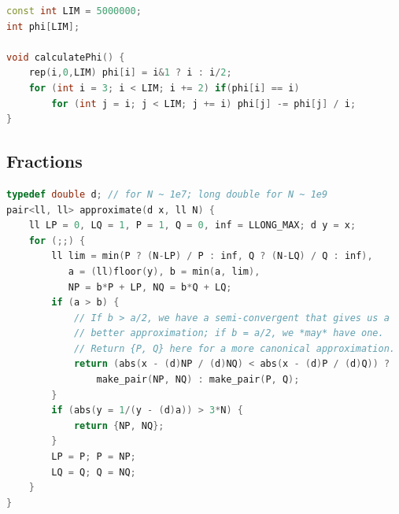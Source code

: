 \begin{multicols}{\Columns}
\begin{lstlisting}[language=C++]
const int LIM = 5000000;
int phi[LIM];

void calculatePhi() {
	rep(i,0,LIM) phi[i] = i&1 ? i : i/2;
	for (int i = 3; i < LIM; i += 2) if(phi[i] == i)
		for (int j = i; j < LIM; j += i) phi[j] -= phi[j] / i;
}
\end{lstlisting}


\subsection{Fractions}
\begin{lstlisting}[language=C++]
typedef double d; // for N ~ 1e7; long double for N ~ 1e9
pair<ll, ll> approximate(d x, ll N) {
	ll LP = 0, LQ = 1, P = 1, Q = 0, inf = LLONG_MAX; d y = x;
	for (;;) {
		ll lim = min(P ? (N-LP) / P : inf, Q ? (N-LQ) / Q : inf),
		   a = (ll)floor(y), b = min(a, lim),
		   NP = b*P + LP, NQ = b*Q + LQ;
		if (a > b) {
			// If b > a/2, we have a semi-convergent that gives us a
			// better approximation; if b = a/2, we *may* have one.
			// Return {P, Q} here for a more canonical approximation.
			return (abs(x - (d)NP / (d)NQ) < abs(x - (d)P / (d)Q)) ?
				make_pair(NP, NQ) : make_pair(P, Q);
		}
		if (abs(y = 1/(y - (d)a)) > 3*N) {
			return {NP, NQ};
		}
		LP = P; P = NP;
		LQ = Q; Q = NQ;
	}
}
\end{lstlisting}


\end{multicols}
